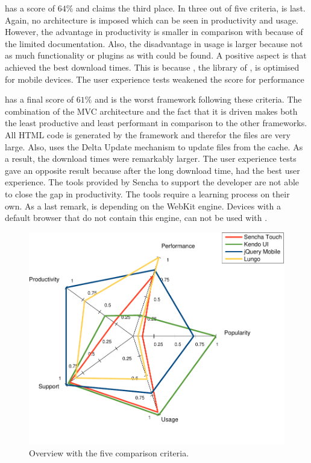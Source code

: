 \documentclass[a4paper]{artikel3}
\begin{document}
\lungo{} has a score of $64\%$ and claims the third place.
In three out of five criteria,  \lungo{} is last.
Again, no architecture is imposed which can be seen in productivity and usage.
However,  the advantage in productivity is smaller in comparison with \jqma{} because of the limited documentation.
Also, the disadvantage in usage is larger because not as much functionality or plugins as with \jqma{} could be found.
A positive aspect is that \lungo{} achieved the best download times.  
This is because \quo{},  the \js{} library of \lungo{},  is optimised for mobile devices.
The user experience tests weakened the score for performance


\sta{} has a final score of $61\%$ and is the worst framework following these criteria.
The combination of the MVC architecture and the fact that it is \js{} driven makes \sta{} both the least productive and least performant in comparison to the other frameworks.
All HTML code is generated by the framework and therefor the \js{} files are very large.
Also,  \sta{} uses the Delta Update mechanism to update files from the cache.
As a result,  the download times were remarkably larger.
The user experience tests gave an opposite result because after the long download time,  \sta{} had the best user experience.
The tools provided by Sencha to support the developer are not able to close the gap in productivity.
The tools require a learning process on their own.
As a last remark,  \sta{} is depending on the WebKit engine.
Devices with a default browser that do not contain this engine, can not be used with \sta{}.

\begin{figure}
  \centering
  \includegraphics[width=\columnwidth]{../Masterproef/figuren/spidergraph-final-en.pdf}
  \caption{Overview with the five comparison criteria.}
  \label{fig:spidergraph}
\end{figure}
\end{document}
